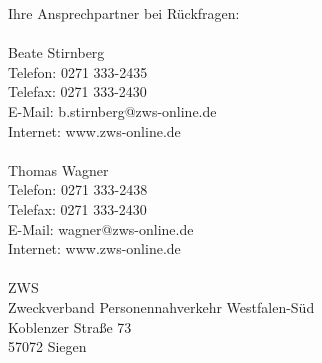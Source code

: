 Ihre Ansprechpartner bei Rückfragen:\\
\\
Beate Stirnberg\\
Telefon: 0271 333-2435\\
Telefax: 0271 333-2430\\
E-Mail: b.stirnberg@zws-online.de\\
Internet: www.zws-online.de\\
\\
Thomas Wagner\\
Telefon: 0271 333-2438\\
Telefax: 0271 333-2430\\
E-Mail: wagner@zws-online.de\\
Internet: www.zws-online.de\\
\\
ZWS\\
Zweckverband Personennahverkehr Westfalen-Süd\\
Koblenzer Straße 73\\
57072 Siegen